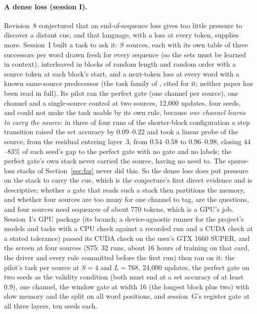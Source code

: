 \documentclass[11pt]{article}
\begin{document}
\paragraph{A dense loss (session I).} Revision~8 conjectured that an end-of-sequence loss gives too little pressure to discover a distant cue, and that language, with a loss at every token, supplies more. Session~I built a task to ask it: $S$ sources, each with its own table of three successors per word drawn fresh for every sequence (so the sets must be learned in context), interleaved in blocks of random length and random order with a source token at each block's start, and a next-token loss at every word with a known same-source predecessor (the task family of \cite{bietti, edelman}, cited for it; neither paper has been read in full). Its pilot ran the perfect gate (one channel per source), one channel and a single-source control at two sources, 12{,}000 updates, four seeds, and could not make the task usable by its own rule, because \emph{one channel learns to carry the source}: in three of four runs of the shorter-block configuration a step transition raised the set accuracy by $0.09$--$0.22$ and took a linear probe of the source, from the residual entering layer~3, from $0.54$--$0.58$ to $0.96$--$0.98$, closing $44$--$83\%$ of each seed's gap to the perfect gate with no gate and no labels; the perfect gate's own stack never carried the source, having no need to. The sparse-loss stacks of Section~\ref{sec:far} never did this. So the dense loss does put pressure on the stack to carry the cue, which is the conjecture's first direct evidence and is descriptive; whether a gate that reads such a stack then partitions the memory, and whether four sources are too many for one channel to tag, are the questions, and four sources need sequences of about 770 tokens, which is a GPU's job. Session~I's GPU package (its branch; a device-agnostic runner for the project's models and tasks with a CPU check against a recorded run and a CUDA check at a stated tolerance) passed its CUDA check on the user's GTX 1660 SUPER, and the screen at four sources (S75: 32 runs, about 16 hours of training on that card, the driver and every rule committed before the first run) then ran on it: the pilot's task per source at $S = 4$ and $L = 768$, 24{,}000 updates, the perfect gate on two seeds as the validity condition (both must end at a set accuracy of at least $0.9$), one channel, the window gate at width 16 (the longest block plus two) with slow memory and the split on all word positions, and session~G's register gate at all three layers, ten seeds each.
\end{document}
